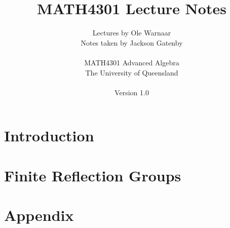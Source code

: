 \documentclass[a4paper]{report}
\title{MATH4301 Lecture Notes}
\author{Lectures by Ole Warnaar\\
Notes taken by Jackson Gatenby\\
\\
MATH4301 Advanced Algebra\\
The University of Queensland\\
\\
Version 1.0}
\begin{document}
\maketitle
\tableofcontents


\chapter{Introduction}







\chapter{Finite Reflection Groups}


















\appendix
\chapter{Appendix}


\end{document}
